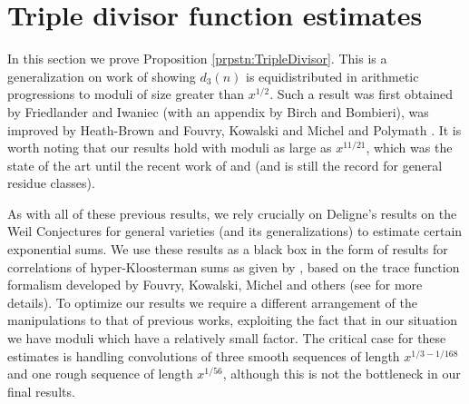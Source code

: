 \documentclass[10pt]{amsart}
\theoremstyle{plain}
\numberwithin{equation}{section}
\begin{document}
\section{Triple divisor function estimates}\label{sec:TripleDivisor}
%
%
%
%
In this section we prove Proposition \ref{prpstn:TripleDivisor}. This is a generalization on work of showing $d_3(n)$ is equidistributed in arithmetic progressions to moduli of size greater than $x^{1/2}$. Such a result was first obtained by Friedlander and Iwaniec \cite{FIDivisor} (with an appendix by Birch and Bombieri), was improved by Heath-Brown \cite{HBDivisor} and Fouvry, Kowalski and Michel \cite{FKMDivisor} and Polymath \cite{Polymath}. It is worth noting that our results hold with moduli as large as $x^{11/21}$, which was the state of the art until the recent work of \cite{FKMDivisor} and \cite{Polymath} (and is still the record for general residue classes).

As with all of these previous results, we rely crucially on Deligne's results \cite{Deligne1,Deligne2} on the Weil Conjectures for general varieties (and its generalizations) to estimate certain exponential sums. We use these results as a black box in the form of results for correlations of hyper-Kloosterman sums as given by \cite{Polymath}, based on the trace function formalism developed by Fouvry, Kowalski, Michel and others (see \cite{FKMS} for more details). To optimize our results we require a different arrangement of the manipulations to that of previous works, exploiting the fact that in our situation we have moduli which have a relatively small factor. The critical case for these estimates is handling convolutions of three smooth sequences of length $x^{1/3-1/168}$ and one rough sequence of length $x^{1/56}$, although this is not the bottleneck in our final results.
\end{document}
